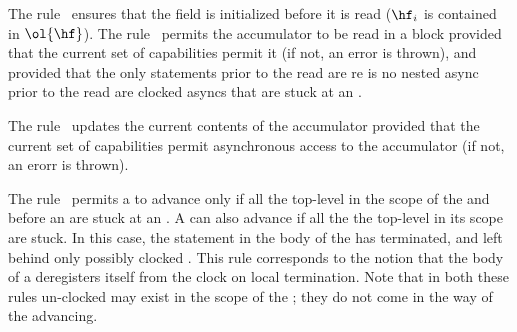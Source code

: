 %
The rule~ ensures that the field is initialized before it is
read ($\hf_i$ is contained in $\ol{\hf}$).
%
The rule~ permits the accumulator to be read in a
block provided that the current set of capabilities permit it (if not,
an error is thrown), and provided that the only statements prior to
the read are re is no nested async prior to the read are clocked
asyncs that are stuck at an \hadvance.

The rule~ updates the current contents of the
accumulator provided that the current set of capabilities permit
asynchronous access to the accumulator (if not, an erorr is thrown).

The rule~ permits a  to advance
only if all the top-level  in the scope of the
 and before an  are stuck at an
. A  can also advance if all the
the top-level  in its scope are stuck. In this
case, the statement in the body of the  has
terminated, and left behind only possibly clocked . This
rule corresponds to the notion that the body of a  deregisters itself from the clock on local termination.
Note that in both these rules un-clocked  may exist in the
scope of the ; they do not come in the way of the
 advancing.

